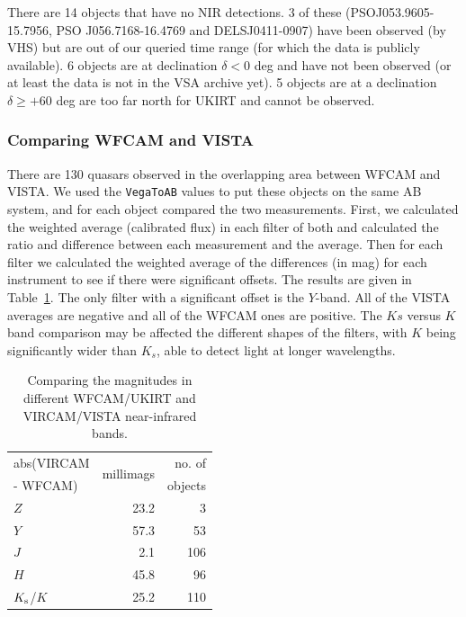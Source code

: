 \documentclass[usenatbib]{mnras}
\begin{document}
There are 14 objects that have no NIR detections. 3 of these
(PSOJ053.9605-15.7956, PSO J056.7168-16.4769 and DELSJ0411-0907) have
been observed (by VHS) but are out of our queried time range (for
which the data is publicly available). 6 objects are at declination
$\delta<0$ deg and have not been observed (or at least the data is not
in the VSA archive yet). 5 objects are at a declination $\delta \geq
+60$ deg are too far north for UKIRT and cannot be observed.


  \subsubsection{Comparing WFCAM and VISTA}
  There are 130 quasars observed in the overlapping area between WFCAM
  and VISTA. We used the {\tt VegaToAB} values to put these objects on
  the same AB system, and for each object compared the two
  measurements. First, we calculated the weighted average (calibrated
  flux) in each filter of both and calculated the ratio and difference
  between each measurement and the average.  Then for each filter we
  calculated the weighted average of the differences (in mag) for each
  instrument to see if there were significant offsets. The results are
  given in Table~\ref{tab:WFCAM_vs_VISTA}.  The only filter with a
  significant offset is the $Y$-band. All of the VISTA averages are
  negative and all of the WFCAM ones are positive. The $Ks$ versus $K$
  band comparison may be affected the different shapes of the filters,
  with $K$ being significantly wider than $K_s$, able to detect light at
  longer wavelengths.
  \begin{table}
    \centering
    \begin{tabular}{l r r}
      \hline  \hline
      abs(VIRCAM & \multirow{2}{*}{millimags} &  no. of  \\
      -  WFCAM)      &                                        &  objects \\
      \hline
      $Z$                 &  23.2 	& 3 \\
      $Y$                 &  57.3 	& 53 \\
      $J$                  &    2.1 	& 106 \\
      $H$                 &  45.8     &  96 \\
      $K_{\rm s}$/$K$ &  25.2     & 110 \\
      \hline  \hline
    \end{tabular}
    \caption{Comparing the magnitudes in different WFCAM/UKIRT and 
      VIRCAM/VISTA near-infrared bands.}
    \label{tab:WFCAM_vs_VISTA}
  \end{table}
  
\end{document}
